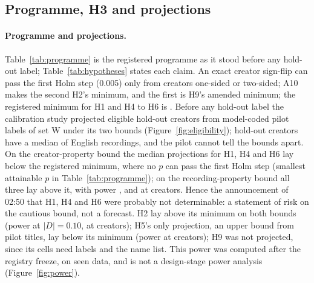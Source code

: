 \begin{table}[t]
\centering
\small

\caption{Cross-vendor check (VG-6) on \VtrUnits{} units of \VtrCreators{} seen check creators, design-weighted to a frame
of \VtrFrameUnits{} units of \VtrRecordings{} recordings (sampling weights, not an ordinal weighted kappa): the
Anthropic reader against each OpenAI reader and their stored majority, kappa with its 90\% creator-bootstrap interval
(coverage not audited; such intervals covered below nominal at \MinCreatorsRegistered{} to \HThreeCreators{} creators
in this project's audit) and unweighted kappa; the rule and its outcome; sensitivity rows, which decide nothing; the
stratum where the small and middle models' first runs disagree; and where the frame weight sits. A cell that VER-3R's
public form withholds (pairs rule, joint audit) reads n.p., with its reason below the table. Validity status:
model-coded; agreement only; not checked by a person.}
\label{tab:crossvendor}
\end{table}

\subsection{Programme, H3 and projections}
\label{app:programme}

\paragraph{Programme and projections.} Table~\ref{tab:programme} is the registered programme as it stood before any
hold-out label; Table~\ref{tab:hypotheses} states each claim. An exact creator sign-flip can pass the first Holm step
(0.005) only from \MinCreatorsOneSided{} creators one-sided or \MinCreatorsTwoSided{} two-sided; A10 makes the second
H2's minimum, and the first is H9's amended minimum; the registered minimum for H1 and H4 to H6 is
\MinCreatorsRegistered. Before any hold-out label the calibration study projected eligible hold-out creators from
model-coded pilot labels of set W under its two bounds (Figure~\ref{fig:eligibility}); hold-out creators have a median
of \HoldoutEnglishRecMedian{} English recordings, and the pilot cannot tell the bounds apart. On the creator-property
bound the median projections for H1, H4 and H6 lay below the registered minimum, where no $p$ can pass the first Holm
step (smallest attainable $p$ in Table~\ref{tab:programme}); on the recording-property bound all three lay above it,
with power \PowerHOneUpper, \PowerHFourUpper{} and \PowerHSixUpper{} at \PowerUpperCreators{} creators. Hence the
announcement of 02:50 that H1, H4 and H6 were probably not determinable: a statement of risk on the cautious bound, not
a forecast. H2 lay above its minimum on both bounds (power \PowerHTwo{} at $|D| = 0.10$, at \PowerHTwoCreators{}
creators); H5's only projection, an upper bound from pilot titles, lay below its minimum (power \PowerHFive{} at
\PowerHFiveCreators{} creators); H9 was not projected, since its cells need labels and the name list. This power was
computed after the registry freeze, on seen data, and is not a design-stage power analysis (Figure~\ref{fig:power}).

